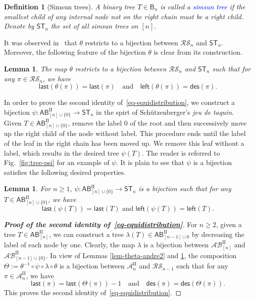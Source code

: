 \documentclass[12pt]{article}
\def\blue{\textcolor{blue}}
\def\blue{\textcolor{blue}}
\numberwithin{equation}{section}
\def\blue{\textcolor{blue}}
\def\blue{\textcolor{blue}}
\theoremstyle{plain}
\newtheorem{lemma}[theorem]{Lemma}
\newtheorem{definition}[theorem]{Definition}
\def\des{\mathsf{des}}
\def\l{\mathsf{left}}
\def\B{\mathsf{B}}
\def\AB{\mathsf{AB}}
\def\last{\mathsf{last}}
\begin{document}
   			
   	   \begin{definition}[Simsun trees]
   		A binary tree $T\in\B_n$ is called a \blue{simsun tree} if the smallest
child of any internal node not on the right chain must be a right child.  Denote by $\mathsf{ST}_n$ the set of all   simsun trees on $[n]$.
			\end{definition} 	
			
			It was observed in~\cite[Proposition~5.2]{Lin} that $\theta$ restricts to a bijection between $\mathcal{RS}_n$ and $\mathsf{ST}_n$. Moreover, the following feature  of the bijection $\theta$ is clear from its construction. 
			
			\begin{lemma}\label{lem-theta-simsun}
   			  The map $\theta$ restricts to a bijection between 
   			$\mathcal{RS}_n$ and $\mathsf{ST}_n$ such that for any $\pi \in \mathcal{RS}_n$, we have
   			$$
   			\last(\theta(\pi))=\last(\pi)\quad\text{and}\quad \l(\theta(\pi))=\des(\pi). 
   			$$
   			\end{lemma}
   		  
   			In order to prove the second identity of~\eqref{eq-equidistribution}, we construct a bijection  $\psi: \AB^{\mathrm{II}}_{[n]\cup\{0\}}\rightarrow\mathsf{ST}_n$ in the spirt of  Sch\" utzenberger's {\em jeu de taquin}.  Given $T\in\AB^{\mathrm{II}}_{[n]\cup\{0\}}$, remove the label $0$ of the
root and then successively move up the right child  of the node
without label. This procedure ends until the label of the  leaf in the right chain has been
moved up. We remove this leaf without a label, which results in the desired tree $\psi(T)$. The reader is referred to Fig.~\ref{fig:tree-psi}  for an example of $\psi$. 
   			 It is plain to see that  $\psi$ is  a bijection satisfies the 
   		 following desired properties.
   		 \begin{lemma}\label{lem-psi}
   		 	For $n\geq 1$,  $\psi: \AB^{\mathrm{II}}_{[n]\cup\{0\}}\rightarrow\mathsf{ST}_n$ is a bijection  such that for any $T\in \AB^{\mathrm{II}}_{[n]\cup \{0\}}$, we have
   		 	$$
   		 	\last(\psi(T))=\last(T)\,\, \mbox{and}\,\, \l(\psi(T))=\l(T).
   		 	$$
   		 	\end{lemma}
   		 	
   		 \begin{proof}[{\bf Proof of the second identity of~\eqref{eq-equidistribution}}]	For $n\geq 2$,   given a tree $T\in  \AB^{\mathrm{II}}_{[n]}$,  we can construct a tree $\lambda(T)\in \AB^{\mathrm{II}}_{[n-1]\cup{0}}$ by decreasing the label  of each node by one.   Clearly, the map $\lambda$ is a bijection  between $\mathcal{AB}^{\mathrm{II}}_{[n]}$ and $\mathcal{AB}^{\mathrm{II}}_{[n-1]\cup \{0\}}$.
		 In view of Lemmas \ref{lem-theta-andre2} and \ref{lem-psi},  the composition  $\Theta:=\theta^{-1}\circ\psi\circ\lambda\circ\theta$ is a bijection between 
   		  	$\mathcal{A}^{\mathrm{II}}_{n}$ and $\mathcal{RS}_{n-1}$  such that for any 
   		  	$\pi\in \mathcal{A}^{\mathrm{II}}_{n}$, we have 
   		  	$$
   		  	\last(\pi)=\last(\Theta(\pi))-1 \quad\mbox{and}\quad\des(\pi)=\des(\Theta(\pi)).
   		  	$$
	This proves  the second identity of~\eqref{eq-equidistribution}. 	 
		  \end{proof}
   		  
\end{document}
